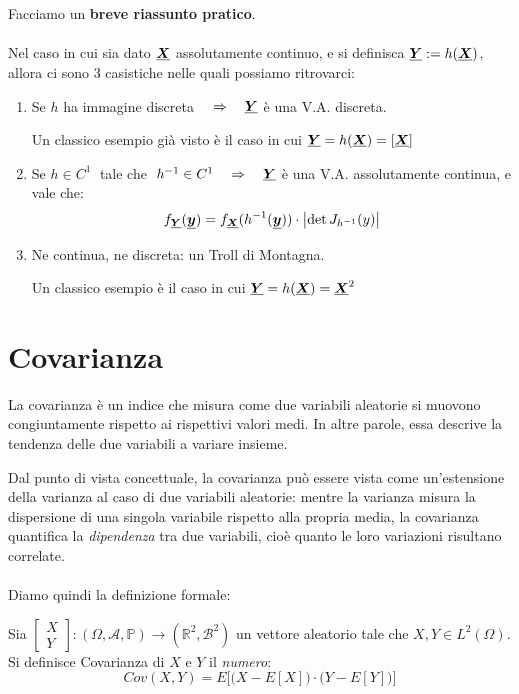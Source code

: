 \bigskip
\noindent
{}\\
\\
Facciamo un \textbf{breve riassunto pratico}.\\
\\
Nel caso in cui sia dato $\underline{{\boldsymbol{X}}}$ assolutamente continuo, e si definisca $\underline{{\boldsymbol{Y}}}:=h(\underline{{\boldsymbol{X}}})$, allora ci sono 3 casistiche nelle quali possiamo ritrovarci:
\begin{enumerate}
\label{riassunto_pratico}
    \item Se $h$ ha immagine discreta $\quad \Rightarrow \quad \underline{{\boldsymbol{Y}}}$ è una V.A. discreta.
    \begin{esempio}
        Un classico esempio già visto è il caso in cui $\underline{{\boldsymbol{Y}}}=h(\underline{{\boldsymbol{X}}})=[\underline{{\boldsymbol{X}}}]$
    \end{esempio}
    \item Se $h\in C^1\;$ tale che $\;h^{-1}\in C^1 \quad \Rightarrow \quad \underline{{\boldsymbol{Y}}}$ è una V.A. assolutamente continua, e vale che:
    \[f_{\underline{{\boldsymbol{Y}}}}(\underline{{\boldsymbol{y}}})=f_{\underline{{\boldsymbol{X}}}}(h^{-1}(\underline{{\boldsymbol{y}}}))\cdot \bigl|\det J_{h^{-1}}(y)\bigr|\]
    \item Ne continua, ne discreta: un Troll di Montagna.
    \begin{esempio}
        Un classico esempio è il caso in cui $\underline{{\boldsymbol{Y}}}=h(\underline{{\boldsymbol{X}}})=\underline{{\boldsymbol{X}}}^2$
    \end{esempio}
\end{enumerate}

\bigskip
\section{Covarianza}
La covarianza è un indice che misura come due variabili aleatorie si muovono congiuntamente rispetto ai rispettivi valori medi. In altre parole, essa descrive la tendenza delle due variabili a variare insieme.

\medskip
Dal punto di vista concettuale, la covarianza può essere vista come
un'estensione della varianza al caso di due variabili aleatorie:
mentre la varianza misura la dispersione di una singola variabile
rispetto alla propria media, la covarianza quantifica la
\emph{dipendenza} tra due variabili, cioè quanto le loro variazioni risultano correlate.\\
\\
Diamo quindi la definizione formale:
\begin{definizione}
    Sia $\begin{bmatrix}X\\Y\end{bmatrix}:(\Omega, \mathcal{A}, \mathbb{P})\to (\mathbb{R}^2, \mathcal{B}^2)$ un vettore aleatorio tale che $X, Y\in L^2(\Omega)$. Si definisce Covarianza di $X$ e $Y$ il \textit{numero}:
    \[\boxed{Cov(X, Y) = E\bigl[\bigl(X-E[X]\bigr)\cdot \bigl(Y-E[Y]\bigr)\bigr]}\]
\end{definizione}


